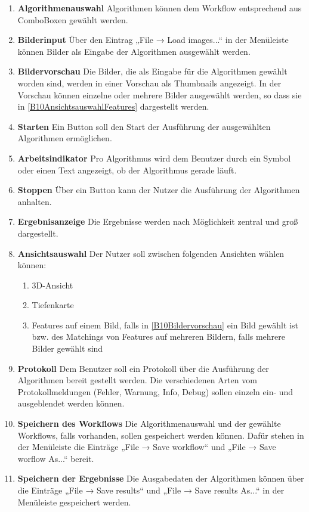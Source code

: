\begin{enumerate}[ align=left, label={\textbf{\textbackslash B10\arabic*0\textbackslash}} ]
	\item \textbf{Algorithmenauswahl} Algorithmen können dem Workflow entsprechend aus ComboBoxen gewählt werden.
	\item \textbf{Bilderinput} Über den Eintrag „File → Load images...“ in der Menüleiste können Bilder als Eingabe der Algorithmen ausgewählt werden.
	\item \textbf{Bildervorschau} \label{B10Bildervorschau} Die Bilder, die als Eingabe für die Algorithmen gewählt worden sind, werden in einer Vorschau als Thumbnails angezeigt. In der Vorschau können einzelne oder mehrere Bilder ausgewählt werden, so dass sie in \ref{B10AnsichtsauswahlFeatures} dargestellt werden.
	\item \textbf{Starten} \label{B10Starten} Ein Button soll den Start der Ausführung der ausgewählten Algorithmen ermöglichen.
	\item \textbf{Arbeitsindikator} Pro Algorithmus wird dem Benutzer durch ein Symbol oder einen Text angezeigt, ob der Algorithmus gerade läuft.
	\item \textbf{Stoppen} Über ein Button kann der Nutzer die Ausführung der Algorithmen anhalten.
	\item \textbf{Ergebnisanzeige} Die Ergebnisse werden nach Möglichkeit zentral und groß dargestellt.
	\item \textbf{Ansichtsauswahl} Der Nutzer soll zwischen folgenden Ansichten wählen können:
		\begin{enumerate}[ label={\textbf{\alph*}}, ref={\textbf{\textbackslash B10\arabic{enumi}0\textbackslash\alph*}} ]
			\item 3D-Ansicht
			\item Tiefenkarte
			\item \label{B10AnsichtsauswahlFeatures} Features auf einem Bild, falls in \ref{B10Bildervorschau} ein Bild gewählt ist bzw. des Matchings von Features auf mehreren Bildern, falls mehrere Bilder gewählt sind
		\end{enumerate}
	\item \textbf{Protokoll} Dem Benutzer soll ein Protokoll über die Ausführung der Algorithmen bereit gestellt werden. Die verschiedenen Arten vom Protokollmeldungen (Fehler, Warnung, Info, Debug) sollen einzeln ein- und ausgeblendet werden können.
	\item \textbf{Speichern des Workflows} Die Algorithmenauswahl und der gewählte Workflows, falls vorhanden, sollen gespeichert werden können. Dafür stehen in der Menüleiste die Einträge „File → Save workflow“ und „File → Save worflow As...“ bereit.
	\item \textbf{Speichern der Ergebnisse} Die Ausgabedaten der Algorithmen können über die Einträge „File → Save results“ und „File → Save results As...“ in der Menüleiste gespeichert werden.
\end{enumerate}

